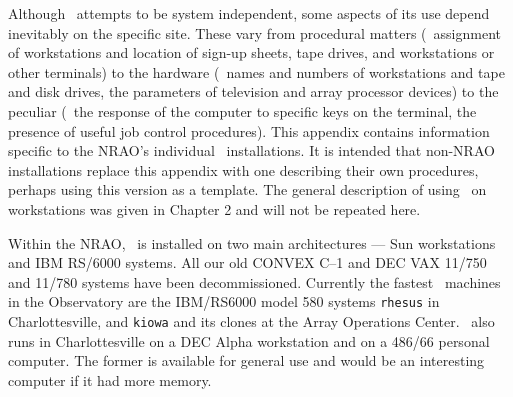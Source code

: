 
\def\titlea{15-Jan-1996 (revised 18-Jan-1996)}
\def\chapt{Z}
\def\Chapt{46}
\pd

     Although \AIPS\ attempts to be system independent, some aspects
of its use depend inevitably on the specific site.  These vary from
procedural matters (\eg\ assignment of workstations and location of
sign-up sheets, tape drives, and workstations or other terminals) to
the hardware (\eg\ names and numbers of workstations and tape and disk
drives, the parameters of television and array processor devices) to
the peculiar (\eg\ the response of the computer to specific keys on
the terminal, the presence of useful job control procedures).  This
appendix contains information specific to the NRAO's individual \AIPS\
installations.  It is intended that non-NRAO installations replace
this appendix with one describing their own procedures, perhaps using
this version as a template.  The general description of using \AIPS\
on workstations was given in Chapter 2 and will not be repeated here.

    Within the NRAO, \AIPS\ is installed on two main architectures ---
Sun workstations and IBM RS/6000 systems.  All our old CONVEX C--1 and
DEC VAX 11/750 and 11/780 systems have been decommissioned.  Currently
the fastest \AIPS\ machines in the Observatory are the IBM/RS6000
model 580 systems {\tt rhesus} in Charlottesville, and {\tt kiowa} and
its clones at the Array Operations Center.  \AIPS\ also runs in
Charlottesville on a DEC Alpha workstation and on a 486/66 personal
computer.  The former is available for general use and would be an
interesting computer if it had more memory.

